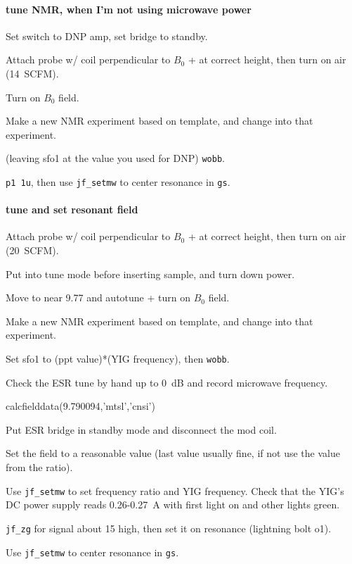 \paragraph{tune NMR, when I'm not using microwave power}
Set switch to DNP amp, set bridge to standby.

Attach probe w/ coil perpendicular to $B_0$ + at correct height, then turn on air (14~SCFM).

Turn on $B_0$ field.

Make a new NMR experiment based on template, and change into that experiment.

(leaving sfo1 at the value you used for DNP) \texttt{wobb}. 

\texttt{p1 1u}, then use \texttt{jf\_setmw} to center resonance in \texttt{gs}.

\paragraph{tune and set resonant field}
Attach probe w/ coil perpendicular to $B_0$ + at correct height, then turn on air (20~SCFM).

Put into tune mode before inserting sample, and turn down power.

Move to near 9.77 and autotune + turn on $B_0$ field.

Make a new NMR experiment based on template, and change into that experiment.


Set sfo1 to (ppt value)*(YIG frequency), then \texttt{wobb}. 

Check the ESR tune by hand up to 0~dB and record microwave frequency.
\begin{python}[off]
calcfielddata(9.790094,'mtsl','cnsi')
\end{python}
Put ESR bridge in standby mode and disconnect the mod coil.

Set the field to a reasonable value (last value usually fine, if not use the value from the ratio).

Use \texttt{jf\_setmw} to set frequency ratio and YIG frequency.
Check that the YIG's DC power supply reads 0.26-0.27~A with first light on and other lights green.

\texttt{jf\_zg} for signal about 15 high, then set it on resonance (lightning bolt o1).

Use \texttt{jf\_setmw} to center resonance in \texttt{gs}.

